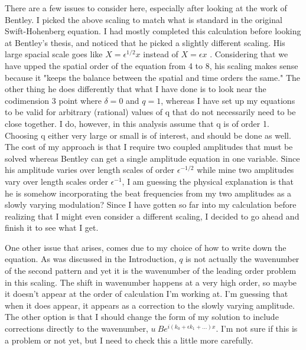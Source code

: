 \documentclass[api,pof,pre,12pt,a4paper]{revtex4-1}
\begin{document}
There are a few issues to consider here, especially after looking at the work of Bentley.  I picked the above scaling to match what is standard in the original Swift-Hohenberg equation.  I had mostly completed this calculation before looking at Bentley's thesis, and noticed that he picked a slightly different scaling.    His large spacial scale goes like  $X=\epsilon^{1/2} x$ instead of  $X=\epsilon x$ .   Considering that we have upped the spatial order of the equation from 4 to 8,  his scaling makes sense because it "keeps the balance between the spatial and time orders the same."   The other thing he does differently that what I have done is to look near the codimension 3 point where $\delta=0$ and $q=1$, whereas I have set up my equations  to be valid for arbitrary (rational) values of q that do not necessarily need to be close together.  I do, however, in this analysis assume that q is of order 1.  Choosing q either very large or small is of interest, and should be done as well.  The cost of my approach is that I require two coupled amplitudes that must be solved whereas Bentley can get a single amplitude equation in one variable.  Since his amplitude varies over length scales of order $\epsilon^{-1/2}$ while mine two amplitudes vary over length scales order $\epsilon^{-1}$, I am guessing the physical explanation is that he is somehow incorporating the beat frequencies from my two amplitudes as a slowly varying modulation?  Since I have gotten so far into my calculation before realizing that I might even consider a different scaling, I decided to go ahead and finish it to see what I get.

One other issue that arises, comes due to my choice of how to write down the equation. As was discussed in the Introduction, $q$ is not actually the wavenumber of the second pattern and yet it is the wavenumber of the leading order problem in this scaling.  The shift in wavenumber happens at a very high order, so maybe it doesn't appear at the order of calculation I'm working at.  I'm guessing that when it does appear, it appears as a correction to the slowly varying amplitude.  The other option is that I should change the form of my solution to include corrections directly to the wavenumber, $u~B e^{i(k_0+\epsilon k_1+...)x}$.  I'm not sure if this is a problem or not yet, but I need to check this a little more carefully.
\end{document}

